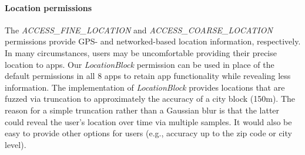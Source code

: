 \documentclass[preprint]{sig-alternate-10pt}
\newcommand{\perm}[1]{\textsf{\textit{#1}}}
\newcommand{\comment}[3][\color{red}]{}%
\newcommand{\jav}[1]{\comment[\color{blue}]{JAV}{#1}}
\newcommand{\tdm}[1]{\comment[\color{red}]{TDM}{#1}}
\newcommand{\polLocationBlockName}{\perm{LocationBlock}\xspace}
\newcommand{\polOwnFilesSDName}{\perm{SDCardOwnFiles}\xspace}
\newcommand{\polSharedSDName}{\perm{SDCardShared}\xspace}
\begin{document}

\paragraph*{Location permissions}  
The \perm{ACCESS\_\-FINE\_\-LOCATION} and
\perm{ACCESS\_\-COARSE\_\-LOCATION} permissions provide
GPS- and networked-based location information, respectively.  In many
circumstances, users may be
uncomfortable providing their precise location to apps.  Our 
\polLocationBlockName{} permission can be used in place of the 
default permissions in all 8 apps to retain app functionality while
revealing less information.  
The implementation of \polLocationBlockName{} provides
locations that are fuzzed via truncation to 
approximately the accuracy of a city block (150m).  The reason for a 
simple truncation rather than a Gaussian blur is that the latter could
reveal the user's location over time via multiple samples. It would
also be easy
to provide other options for users (e.g., accuracy up to the zip code or city
level).  
\end{document}
